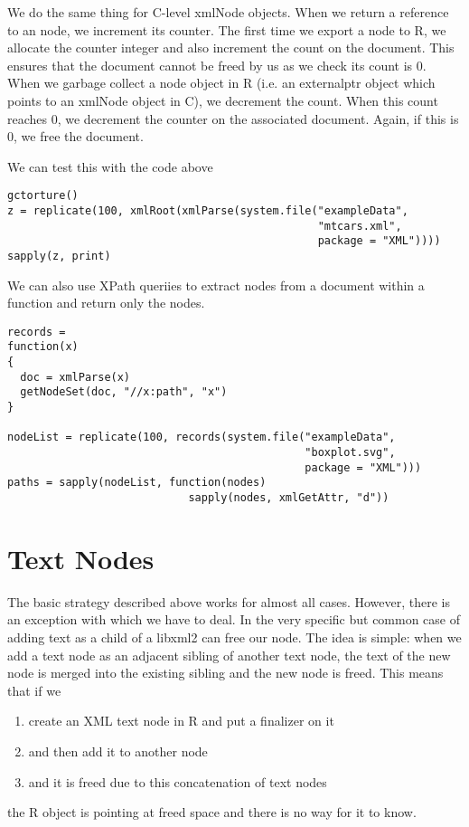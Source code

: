 \documentclass{article}
\begin{document}
We do the same thing for C-level xmlNode objects.  When we return a
reference to an node, we increment its counter.  The first time we
export a node to R, we allocate the counter integer and also increment
the count on the document. This ensures that the document cannot be
freed by us as we check its count is $0$.  When we garbage collect a
node object in R (i.e. an externalptr object which points to an
xmlNode object in C), we decrement the count. When this count reaches
$0$, we decrement the counter on the associated document.
Again, if this is $0$, we free the document.

We can test this with the code above
\begin{verbatim}
gctorture()
z = replicate(100, xmlRoot(xmlParse(system.file("exampleData", 
                                                "mtcars.xml", 
                                                package = "XML"))))
sapply(z, print)
\end{verbatim}
We can also use XPath queriies to extract nodes from a document
within a function and return only the nodes.
\begin{verbatim}
records =
function(x)
{
  doc = xmlParse(x)
  getNodeSet(doc, "//x:path", "x")
}

nodeList = replicate(100, records(system.file("exampleData", 
                                              "boxplot.svg", 
                                              package = "XML")))
paths = sapply(nodeList, function(nodes)
                            sapply(nodes, xmlGetAttr, "d"))
\end{verbatim}
\section{Text Nodes}
The basic strategy described above works for almost all cases.
However, there is an exception with which we have to deal.  In the
very specific but common case of adding text as a child of a libxml2
can free our node.  The idea is simple: when we add a text node as an
adjacent sibling of another text node, the text of the new node is
merged into the existing sibling and the new node is freed.  This
means that if we 
\begin{enumerate}
\item create an XML text node in R and put a finalizer on
it 
\item and then add it to another node 
\item and it is freed due to this concatenation of text nodes
\end{enumerate}
the R object is pointing at freed space and there is no way for it
to know.
\end{document}
